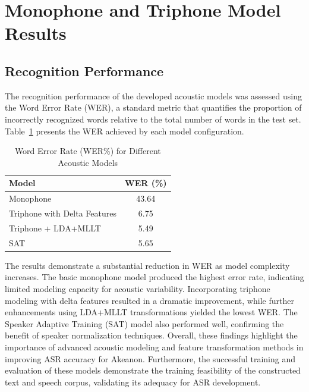 \section{Monophone and Triphone Model Results}

\subsection{Recognition Performance}

The recognition performance of the developed acoustic models was assessed using the Word Error Rate (WER), a standard metric that quantifies the proportion of incorrectly recognized words relative to the total number of words in the test set. Table~\ref{tab:wer-results} presents the WER achieved by each model configuration.

\begin{table}[H]
	\centering
	\renewcommand{\arraystretch}{1.3}
	\setlength{\tabcolsep}{16pt}
	\caption{Word Error Rate (WER\%) for Different Acoustic Models}
	\label{tab:wer-results}
	\begin{tabular}{|l|c|}
		\hline
		\textbf{Model} & \textbf{WER (\%)} \\
		\hline
		Monophone & 43.64 \\
		Triphone with Delta Features & 6.75 \\
		Triphone + LDA+MLLT & 5.49 \\
		SAT & 5.65 \\
		\hline
	\end{tabular}
\end{table}

The results demonstrate a substantial reduction in WER as model complexity increases. The basic monophone model produced the highest error rate, indicating limited modeling capacity for acoustic variability. Incorporating triphone modeling with delta features resulted in a dramatic improvement, while further enhancements using LDA+MLLT transformations yielded the lowest WER. The Speaker Adaptive Training (SAT) model also performed well, confirming the benefit of speaker normalization techniques. Overall, these findings highlight the importance of advanced acoustic modeling and feature transformation methods in improving ASR accuracy for Akeanon. Furthermore, the successful training and evaluation of these models demonstrate the training feasibility of the constructed text and speech corpus, validating its adequacy for ASR development.
